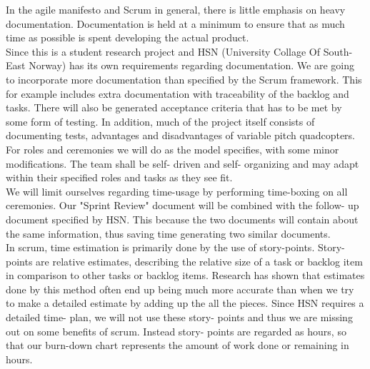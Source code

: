 In the agile manifesto and Scrum in general, there is little emphasis on heavy documentation. Documentation is held at a minimum to ensure that as much time as possible is spent developing the actual product. 
\\
\newline
Since this is a student research project and HSN (University Collage Of South-East Norway) has its own requirements regarding documentation. We are going to incorporate more documentation than specified by the Scrum framework. This for example includes extra documentation with traceability of the backlog and tasks. There will also be generated acceptance criteria that has to be met by some form of testing. In addition, much of the project itself consists of documenting tests, advantages and disadvantages of variable pitch quadcopters. 
\\
\newline
For roles and ceremonies we will do as the model specifies, with some minor modifications. The team shall be self- driven and self- organizing and may adapt within their specified roles and tasks as they see fit. 
\\
\newline
We will limit ourselves regarding time-usage by performing time-boxing on all ceremonies. Our "Sprint Review" document will be combined with the follow- up document specified by HSN. This because the two documents will contain about the same information, thus saving time generating two similar documents.
\\
\newline
In scrum, time estimation is primarily done by the use of story-points. Story-points are relative estimates, describing the relative size of a task or backlog item in comparison to other tasks or backlog items. Research has shown that estimates done by this method often end up being much more accurate than when we try to make a detailed estimate by adding up the all the pieces. Since HSN requires a detailed time- plan, we will not use these story- points and thus we are missing out on some benefits of scrum. Instead story- points are regarded as hours, so that our burn-down chart represents the amount of work done or remaining in hours.  









